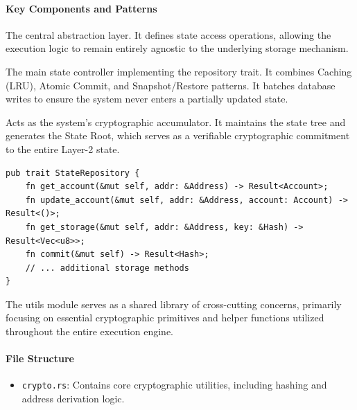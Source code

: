 \paragraph{Key Components and Patterns}
\begin{description}[style=nextline, leftmargin=*]
    \item[StateRepository (Repository Pattern)] 
    The central abstraction layer. It defines state access operations, allowing the execution logic to remain entirely agnostic to the underlying storage mechanism.

    \item[StateManager] 
    The main state controller implementing the repository trait. It combines Caching (LRU), Atomic Commit, and Snapshot/Restore patterns. It batches database writes to ensure the system never enters a partially updated state.

    \item[MerkleTree] 
    Acts as the system's cryptographic accumulator. It maintains the state tree and generates the State Root, which serves as a verifiable cryptographic commitment to the entire Layer-2 state.
\end{description}

\begin{lstlisting}[style=rustStyle, caption={The State Repository Trait}, label={lst:repository}]
pub trait StateRepository {
    fn get_account(&mut self, addr: &Address) -> Result<Account>;
    fn update_account(&mut self, addr: &Address, account: Account) -> Result<()>;
    fn get_storage(&mut self, addr: &Address, key: &Hash) -> Result<Vec<u8>>;
    fn commit(&mut self) -> Result<Hash>;
    // ... additional storage methods
}
\end{lstlisting}


The utils module serves as a shared library of cross-cutting concerns, primarily focusing on essential cryptographic primitives and helper functions utilized throughout the entire execution engine. 

\paragraph{File Structure}
\begin{itemize}[leftmargin=*, noitemsep]
    \item \texttt{crypto.rs}: Contains core cryptographic utilities, including hashing and address derivation logic.
\end{itemize}

